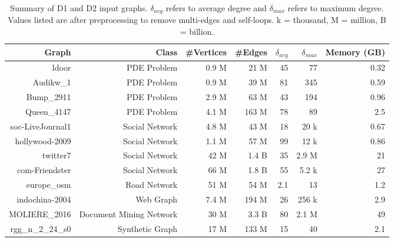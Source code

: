 \begin{table*}[!t]
  \centering
  \caption{Summary of D1 and D2 input graphs. $\delta_{avg}$ refers to average degree and $\delta_{max}$ refers to maximum degree. Values listed are after preprocessing to remove multi-edges and self-loops. k = thousand, M = million, B = billion.}
  \begin{tabular}{|r|r|r|r|r|r|r|}
    \hline
    Graph   & Class   & \#Vertices  & \#Edges  & $\delta_{avg}$ & $\delta_{max}$ & Memory (GB)\\
    \hline
    ldoor           & PDE Problem     & 0.9 M   & 21 M    & 45  & 77  & 0.32 \\
    Audikw\_1       & PDE Problem     & 0.9 M   & 39 M    & 81  & 345 & 0.59 \\
    Bump\_2911      & PDE Problem     & 2.9 M   & 63 M    & 43  & 194 & 0.96 \\
    Queen\_4147     & PDE Problem     & 4.1 M   & 163 M   & 78  & 89  & 2.5 \\
    soc-LiveJournal1& Social Network  & 4.8 M   & 43 M    & 18  & 20 k & 0.67 \\
    hollywood-2009  & Social Network  & 1.1 M   & 57 M    & 99  & 12 k & 0.86 \\
    twitter7        & Social Network  & 42 M    & 1.4 B   & 35  & 2.9 M & 21 \\
    com-Friendster  & Social Network  & 66 M    & 1.8 B   & 55  & 5.2 k & 27 \\
    europe\_osm     & Road Network    & 51 M    & 54 M    & 2.1 & 13    & 1.2 \\
    indochina-2004  & Web Graph       & 7.4 M   & 194 M   & 26  & 256 k & 2.9 \\
    MOLIERE\_2016 & Document Mining Network & 30 M & 3.3 B & 80 & 2.1 M & 49 \\
    rgg\_n\_2\_24\_s0 & Synthetic Graph & 17 M    & 133 M   & 15    & 40 & 2.1\\

\end{tabular}
\end{table*}
